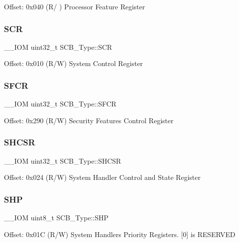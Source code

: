 Offset\+: 0x040 (R/ ) Processor Feature Register \mbox{\label{struct_s_c_b___type_a3a4840c6fa4d1ee75544f4032c88ec34}} 
\subsubsection{\texorpdfstring{SCR}{SCR}}
{\footnotesize\ttfamily \+\_\+\+\_\+\+I\+OM uint32\+\_\+t S\+C\+B\+\_\+\+Type\+::\+S\+CR}

Offset\+: 0x010 (R/W) System Control Register \mbox{\label{struct_s_c_b___type_a82273352d2e8c7a28a7b7cbdfc3d6a75}} 
\subsubsection{\texorpdfstring{SFCR}{SFCR}}
{\footnotesize\ttfamily \+\_\+\+\_\+\+I\+OM uint32\+\_\+t S\+C\+B\+\_\+\+Type\+::\+S\+F\+CR}

Offset\+: 0x290 (R/W) Security Features Control Register \mbox{\label{struct_s_c_b___type_a7b5ae9741a99808043394c4743b635c4}} 
\subsubsection{\texorpdfstring{SHCSR}{SHCSR}}
{\footnotesize\ttfamily \+\_\+\+\_\+\+I\+OM uint32\+\_\+t S\+C\+B\+\_\+\+Type\+::\+S\+H\+C\+SR}

Offset\+: 0x024 (R/W) System Handler Control and State Register \mbox{\label{struct_s_c_b___type_a5c40d124f95a3f7f431a3d5409d6ad28}} 
\subsubsection{\texorpdfstring{SHP}{SHP}\hspace{0.1cm}{\footnotesize\ttfamily [1/2]}}
{\footnotesize\ttfamily \+\_\+\+\_\+\+I\+OM uint8\+\_\+t S\+C\+B\+\_\+\+Type\+::\+S\+HP}

Offset\+: 0x01C (R/W) System Handlers Priority Registers. \mbox{[}0\mbox{]} is R\+E\+S\+E\+R\+V\+ED

